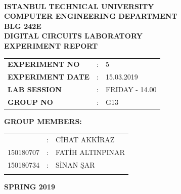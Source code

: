 \documentclass[pdftex,12pt,a4paper]{article}
\begin{document}
\begin{titlepage}
\begin{center}
\textbf{}\\
\textbf{\Large{ISTANBUL TECHNICAL UNIVERSITY}}\\
\vspace{0.5cm}
\textbf{\Large{COMPUTER ENGINEERING DEPARTMENT}}\\
\vspace{2cm}
\textbf{\Large{BLG 242E\\ DIGITAL CIRCUITS LABORATORY\\ EXPERIMENT REPORT}}\\
\vspace{2.8cm}
\begin{table}[ht]
\centering
\Large{
\begin{tabular}{lcl}
\textbf{EXPERIMENT NO}  & : & 5 \\
\textbf{EXPERIMENT DATE}  & : & 15.03.2019 \\
\textbf{LAB SESSION}  & : & FRIDAY - 14.00 \\
\textbf{GROUP NO}  & : & G13 \\
\end{tabular}}
\end{table}
\vspace{1cm}
\textbf{\Large{GROUP MEMBERS:}}\\
\begin{table}[ht]
\centering
\Large{
\begin{tabular}{rcl}
{
150180704  & : & C\.{I}HAT AKK\.{I}RAZ \\
150180707  & : & FAT\.{I}H ALTINPINAR \\
150180734  & : & S\.{I}NAN \c{S}AR \\
}
\end{tabular}}
\end{table}
\vspace{2.8cm}
\textbf{\Large{SPRING 2019}}

\end{center}

\end{titlepage}

\newpage
\newpage

\thispagestyle{empty}
\setcounter{tocdepth}{4}
\tableofcontents
\clearpage
\end{document}
